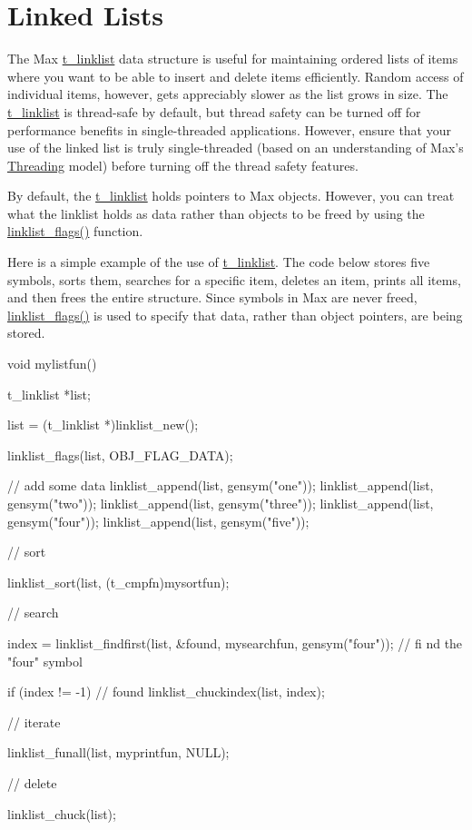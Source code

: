 \hypertarget{chapter_datastructures_chapter_datastructures_linkedlists}{}\section{Linked Lists}\label{chapter_datastructures_chapter_datastructures_linkedlists}
The Max \hyperlink{structt__linklist}{t\_\-linklist} data structure is useful for maintaining ordered lists of items where you want to be able to insert and delete items efficiently. Random access of individual items, however, gets appreciably slower as the list grows in size. The \hyperlink{structt__linklist}{t\_\-linklist} is thread-\/safe by default, but thread safety can be turned off for performance benefits in single-\/threaded applications. However, ensure that your use of the linked list is truly single-\/threaded (based on an understanding of Max's \hyperlink{chapter_threading}{Threading} model) before turning off the thread safety features.

By default, the \hyperlink{structt__linklist}{t\_\-linklist} holds pointers to Max objects. However, you can treat what the linklist holds as data rather than objects to be freed by using the \hyperlink{group__linklist_gacb89cb9e0a3b6c8e631dd00734643cdb}{linklist\_\-flags()} function.

Here is a simple example of the use of \hyperlink{structt__linklist}{t\_\-linklist}. The code below stores five symbols, sorts them, searches for a specific item, deletes an item, prints all items, and then frees the entire structure. Since symbols in Max are never freed, \hyperlink{group__linklist_gacb89cb9e0a3b6c8e631dd00734643cdb}{linklist\_\-flags()} is used to specify that data, rather than object pointers, are being stored.


\begin{DoxyCode}
    void mylistfun()
    {
    t_linklist *list;

    list = (t_linklist *)linklist_new();

    linklist_flags(list, OBJ_FLAG_DATA);

    // add some data
    linklist_append(list, gensym("one"));
    linklist_append(list, gensym("two"));
    linklist_append(list, gensym("three"));
    linklist_append(list, gensym("four"));
    linklist_append(list, gensym("five"));

    // sort

    linklist_sort(list, (t_cmpfn)mysortfun);

    // search

    index = linklist_findfirst(list, &found, mysearchfun, gensym("four"));  // fi
      nd the "four" symbol

    if (index != -1)    // found
        linklist_chuckindex(list, index);

    // iterate

    linklist_funall(list, myprintfun, NULL);

    // delete

    linklist_chuck(list);

    }
\end{DoxyCode}


